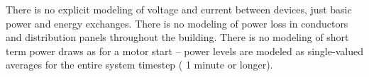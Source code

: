 There is no explicit modeling of voltage and current between devices, just basic power and energy exchanges.  There is no modeling of power loss in conductors and distribution panels throughout the building.  There is no modeling of short term power draws as for a motor start -- power levels are modeled as single-valued averages for the entire system timestep ( 1 minute or longer).